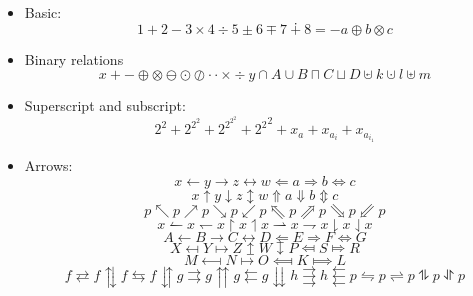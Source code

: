 \documentclass{article}
\begin{document}
\begin{itemize}
  \item Basic:
        \[ 1 + 2 - 3 \times 4 \div 5 \pm 6 \mp 7 \dotplus 8 = -a \oplus b \otimes c \]

  \item Binary relations
        \[
          x + - \oplus \otimes \ominus \odot \oslash \cdot \cdotp \times \div
          y \cap A \cup B \sqcap C \sqcup D \cupleftarrow k \cupdot l \uplus m
        \]

  \item Superscript and subscript:
        \[ 2^2 + 2^{2^2} + 2^{2^{2^2}} + {2^2}^2 + x_a + x_{a_i} + x_{a_{i_1}} \]

  \item Arrows:
        \[
          x \leftarrow y \rightarrow z \leftrightarrow w
            \Leftarrow a \Rightarrow b \Leftrightarrow c
        \]
        \[
          x \uparrow   y \downarrow  z \updownarrow    w
            \Uparrow   a \Downarrow  b \Updownarrow    c
        \]
        \[
          p \nwarrow p \nearrow p \searrow p \swarrow p
            \Nwarrow p \Nearrow p \Searrow p \Swarrow p
        \]
        \[
          x \leftharpoonup    x \leftharpoondown  x
            \upharpoonright   x \upharpoonleft    x
            \rightharpoonup   x \rightharpoondown x
            \downharpoonright x \downharpoonleft  x
        \]
        \[
          A \longleftarrow B \longrightarrow C \longleftrightarrow D
            \Longleftarrow E \Longrightarrow F \Longleftrightarrow G
        \]
        \[
          X \mapsfrom Y \mapsto Z \mapsup W \mapsdown P \Mapsfrom S \Mapsto R
        \]
        \[
          M \longmapsfrom N \longmapsto O \Longmapsfrom K \Longmapsto L
        \]
        \[
          f \rightleftarrows  f \updownarrows f \leftrightarrows f \downuparrows
          g \rightrightarrows g \upuparrows   g \leftleftarrows  g \downdownarrows
          h \rightthreearrows h \leftthreearrows
          p \leftrightharpoons       p \rightleftharpoons
          p \updownharpoonsleftright p \downupharpoonsleftright p
        \]


\end{itemize}
\end{document}
